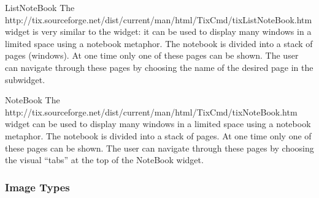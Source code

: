 
\begin{classdesc}{ListNoteBook}{}
The 
{http://tix.sourceforge.net/dist/current/man/html/TixCmd/tixListNoteBook.htm}
widget is very similar to the  widget: it can be
used to display many windows in a limited space using a notebook
metaphor. The notebook is divided into a stack of pages (windows). At
one time only one of these pages can be shown. The user can navigate
through these pages by choosing the name of the desired page in the
 subwidget.
\end{classdesc}


\begin{classdesc}{NoteBook}{}
The 
{http://tix.sourceforge.net/dist/current/man/html/TixCmd/tixNoteBook.htm}
widget can be used to display many windows in a limited space using a
notebook metaphor. The notebook is divided into a stack of pages. At
one time only one of these pages can be shown. The user can navigate
through these pages by choosing the visual ``tabs'' at the top of the
NoteBook widget.
\end{classdesc}





\subsubsection{Image Types}

